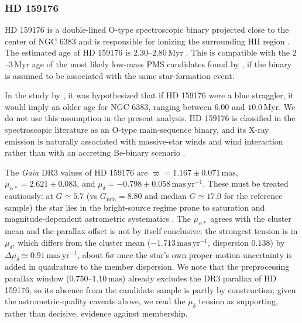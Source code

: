 \documentclass{aa}
\begin{document}
\subsubsection{HD 159176}
HD 159176 is a double-lined O-type spectroscopic binary projected close to the center of NGC 6383 and is responsible for ionizing the surrounding HII region \citep{1993Obs...113..204S,2007A&A...474..193L,2016ApJ...832..211P}. The estimated age of HD 159176 is $2.30$--$2.80\,\mathrm{Myr}$ \citep{2010AA...511A..25R}. This is compatible with the $2$--$3\,\mathrm{Myr}$ age of the most likely low-mass PMS candidates found by \citet{2010AA...511A..25R}, if the binary is assumed to be associated with the same star-formation event.

In the study by \citet{2018AA...610A..30A}, it was hypothesized that if HD 159176 were a blue straggler, it would imply an older age for NGC 6383, ranging between $6.00$ and $10.0\,\mathrm{Myr}$. We do not use this assumption in the present analysis. HD 159176 is classified in the spectroscopic literature as an O-type main-sequence binary, and its X-ray emission is naturally associated with massive-star winds and wind interaction rather than with an accreting Be-binary scenario \citep{2003AA...407..925R,1993Obs...113..204S,2007A&A...474..193L,2016ApJ...832..211P}.

The \textit{Gaia} DR3 values of HD 159176 are $\varpi = 1.167 \pm 0.071\,\mathrm{mas}$, $\mu_{\alpha*}=2.621 \pm 0.083$, and $\mu_{\delta}=-0.798 \pm 0.058\,\mathrm{mas\,yr^{-1}}$. These must be treated cautiously: at $G\simeq5.7$ (vs $G_{\min}=8.80$ and median $G\simeq17.0$ for the reference sample) the star lies in the bright-source regime prone to saturation and magnitude-dependent astrometric systematics \citep{2021A&A...649A...2L,2021A&A...649A...4L,2021A&A...649A.124C,2022A&A...657A.130M}. The $\mu_{\alpha*}$ agrees with the cluster mean and the parallax offset is not by itself conclusive; the strongest tension is in $\mu_{\delta}$, which differs from the cluster mean ($-1.713\,\mathrm{mas\,yr^{-1}}$, dispersion $0.138$) by $\Delta\mu_{\delta}\simeq0.91\,\mathrm{mas\,yr^{-1}}$, about $6\sigma$ once the star's own proper-motion uncertainty is added in quadrature to the member dispersion. We note that the preprocessing parallax window ($0.750$--$1.10\,\mathrm{mas}$) already excludes the DR3 parallax of HD 159176, so its absence from the candidate sample is partly by construction; given the astrometric-quality caveats above, we read the $\mu_{\delta}$ tension as supporting, rather than decisive, evidence against membership.
\end{document}
